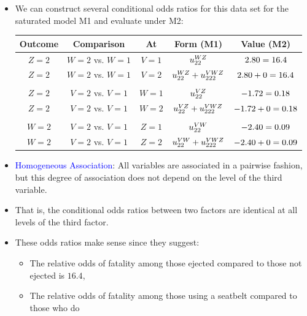 \documentclass[oneside]{book}\usepackage[]{graphicx}\usepackage[svgnames]{xcolor}
\let\exp\relax%
\begin{document}
\begin{itemize}
    \item We can construct several conditional odds ratios for this data set for the saturated
          model M1 and evaluate under M2:
          \begin{table}[H]
              \centering
              \begin{NiceTabular}{c|c|c|c|c}
                  \toprule
                  Outcome & Comparison & At & Form (M1) & Value (M2)\\
                  \midrule
                  $ Z=2 $ & $ W=2 $ vs. $ W=1 $ & $ V=1 $ & $ \exp{u_{22}^{WZ}} $ & $ \exp{2.80}=16.4 $\\
                  $ Z=2 $ & $ W=2 $ vs. $ W=1 $ & $ V=2 $ & $ \exp{u_{22}^{WZ}+u_{222}^{VWZ}} $ & $ \exp{2.80+0}=16.4 $\\\\
                  $ Z=2 $ & $ V=2 $ vs. $ V=1 $ & $ W=1 $ & $ \exp{u_{22}^{VZ}} $ & $ \exp{-1.72}=0.18 $\\
                  $ Z=2 $ & $ V=2 $ vs. $ V=1 $ & $ W=2 $ & $ \exp{u_{22}^{VZ}+u_{222}^{VWZ}} $ & $ \exp{-1.72+0}=0.18 $\\\\
                  $ W=2 $ & $ V=2 $ vs. $ V=1 $ & $ Z=1 $ & $ \exp{u_{22}^{VW}} $ & $ \exp{-2.40}=0.09 $\\
                  $ W=2 $ & $ V=2 $ vs. $ V=1 $ & $ Z=2 $ & $ \exp{u_{22}^{VW}+u_{222}^{VWZ}} $ & $ \exp{-2.40+0}=0.09 $\\
                  \bottomrule
              \end{NiceTabular}
          \end{table}
    \item \textcolor{Blue}{Homogeneous Association}: All variables are associated in a pairwise fashion, but
          this degree of association does not depend on the level of the third variable.
    \item That is, the conditional odds ratios between two factors are identical at all levels of
          the third factor.
    \item These odds ratios make sense since they suggest:
          \begin{itemize}
              \item The relative odds of fatality among those ejected compared to those not ejected is
                    $16.4$,
              \item The relative odds of fatality among those using a seatbelt compared to those who do

\end{itemize}
\end{itemize}
\end{document}

